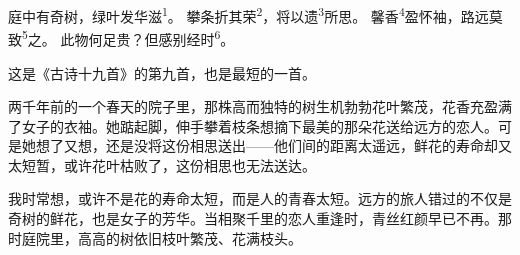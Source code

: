 
\begin{poem}
庭中有奇树，绿叶发华滋\textsuperscript{1}。
攀条折其荣\textsuperscript{2}，将以遗\textsuperscript{3}所思。
馨香\textsuperscript{4}盈怀袖，路远莫致\textsuperscript{5}之。
此物何足贵？但感别经时\textsuperscript{6}。
\end{poem}

\begin{annotations}
\end{annotations}

\begin{appreciation}
这是《古诗十九首》的第九首，也是最短的一首。

两千年前的一个春天的院子里，那株高而独特的树生机勃勃花叶繁茂，花香充盈满了女子的衣袖。她踮起脚，伸手攀着枝条想摘下最美的那朵花送给远方的恋人。可是她想了又想，还是没将这份相思送出——他们间的距离太遥远，鲜花的寿命却又太短暂，或许花叶枯败了，这份相思也无法送达。

我时常想，或许不是花的寿命太短，而是人的青春太短。远方的旅人错过的不仅是奇树的鲜花，也是女子的芳华。当相聚千里的恋人重逢时，青丝红颜早已不再。那时庭院里，高高的树依旧枝叶繁茂、花满枝头。
\end{appreciation}
